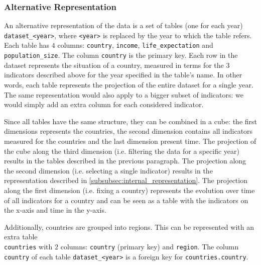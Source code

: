 \subsubsection{Alternative Representation}
An alternative representation of the data is a set of tables (one for each year) \texttt{dataset\_<year>}, where \texttt{<year>} is replaced by the year to which the table refers.
Each table has $4$ columns: \texttt{country}, \texttt{income}, \texttt{life\_expectation} and \texttt{population\_size}.
The column \texttt{country} is the primary key.
Each row in the dataset represents the situation of a country, measured in terms for the $3$ indicators described above for the year specified in the table's name.
In other words, each table represents the projection of the entire dataset for a single year.
The same representation would also apply to a bigger subset of indicators: we would simply add an extra column for each considered indicator.

Since all tables have the same structure, they can be combined in a cube:
the first dimensions represents the countries, the second dimension contains all indicators measured for the countries and the last dimension present time.
The projection of the cube along the third dimension (i.e. filtering the data for a specific year) results in the tables described in the previous paragraph.
The projection along the second dimension (i.e. selecting a single indicator) results in the representation described in \cref{subsubsec:internal_representation}. 
The projection along the first dimension (i.e. fixing a country) represents the evolution over time of all indicators for a country and can be seen as a table with the indicators on the x-axis and time in the y-axis.

Additionally, countries are grouped into regions.
This can be represented with an extra table \\ \texttt{countries} with $2$ columns: \texttt{country} (primary key) and \texttt{region}.
The column \texttt{country} of each table \texttt{dataset\_<year>} is a foreign key for \texttt{countries.country}.
